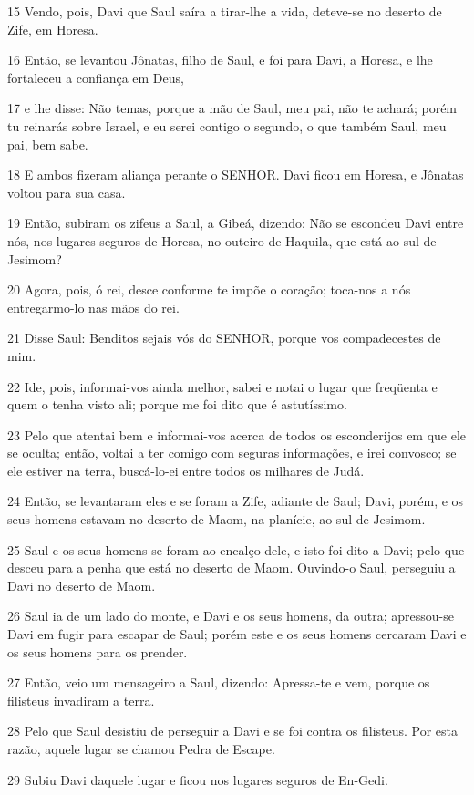 \par 15 Vendo, pois, Davi que Saul saíra a tirar-lhe a vida, deteve-se no deserto de Zife, em Horesa.
\par 16 Então, se levantou Jônatas, filho de Saul, e foi para Davi, a Horesa, e lhe fortaleceu a confiança em Deus,
\par 17 e lhe disse: Não temas, porque a mão de Saul, meu pai, não te achará; porém tu reinarás sobre Israel, e eu serei contigo o segundo, o que também Saul, meu pai, bem sabe.
\par 18 E ambos fizeram aliança perante o SENHOR. Davi ficou em Horesa, e Jônatas voltou para sua casa.
\par 19 Então, subiram os zifeus a Saul, a Gibeá, dizendo: Não se escondeu Davi entre nós, nos lugares seguros de Horesa, no outeiro de Haquila, que está ao sul de Jesimom?
\par 20 Agora, pois, ó rei, desce conforme te impõe o coração; toca-nos a nós entregarmo-lo nas mãos do rei.
\par 21 Disse Saul: Benditos sejais vós do SENHOR, porque vos compadecestes de mim.
\par 22 Ide, pois, informai-vos ainda melhor, sabei e notai o lugar que freqüenta e quem o tenha visto ali; porque me foi dito que é astutíssimo.
\par 23 Pelo que atentai bem e informai-vos acerca de todos os esconderijos em que ele se oculta; então, voltai a ter comigo com seguras informações, e irei convosco; se ele estiver na terra, buscá-lo-ei entre todos os milhares de Judá.
\par 24 Então, se levantaram eles e se foram a Zife, adiante de Saul; Davi, porém, e os seus homens estavam no deserto de Maom, na planície, ao sul de Jesimom.
\par 25 Saul e os seus homens se foram ao encalço dele, e isto foi dito a Davi; pelo que desceu para a penha que está no deserto de Maom. Ouvindo-o Saul, perseguiu a Davi no deserto de Maom.
\par 26 Saul ia de um lado do monte, e Davi e os seus homens, da outra; apressou-se Davi em fugir para escapar de Saul; porém este e os seus homens cercaram Davi e os seus homens para os prender.
\par 27 Então, veio um mensageiro a Saul, dizendo: Apressa-te e vem, porque os filisteus invadiram a terra.
\par 28 Pelo que Saul desistiu de perseguir a Davi e se foi contra os filisteus. Por esta razão, aquele lugar se chamou Pedra de Escape.
\par 29 Subiu Davi daquele lugar e ficou nos lugares seguros de En-Gedi.

